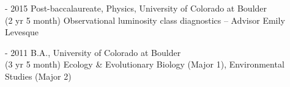 \documentclass[10pt,preprint]{aastex}
\newcommand*{\xdash}[1][3em]{\rule[0.5ex]{#1}{0.7pt}}
\begin{document}
 - 2015 \-\hspace{2.2cm} Post-baccalaureate, Physics, University of Colorado at Boulder \\
(2 yr 5 month) \-\hspace{2.1cm}Observational luminosity class diagnostics -- Advisor Emily Levesque

 - 2011 \-\hspace{2.2cm} B.A., University of Colorado at Boulder \\
(3 yr 5 month) \-\hspace{2.1cm}Ecology \& Evolutionary Biology (Major 1), Environmental Studies (Major 2) 





\end{document}
